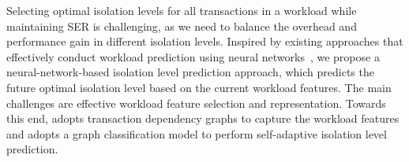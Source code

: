 Selecting optimal isolation levels for all transactions in a workload while maintaining SER is challenging, as we need to balance the overhead and performance gain in different isolation levels.  
Inspired by existing approaches
that effectively conduct workload prediction using neural networks~\cite{DBLP:conf/icde/ZhengZLYCPD24, DBLP:conf/sigmod/MaAHMPG18, DBLP:journals/pvldb/YuZSY24}, 
we propose a neural-network-based isolation level prediction approach, which predicts the future optimal isolation level based on the current workload features. 
The main challenges are effective workload feature selection and representation. 
Towards this end, \sysname adopts transaction dependency graphs to capture the workload features and adopts a graph classification model to perform self-adaptive isolation level prediction. 


